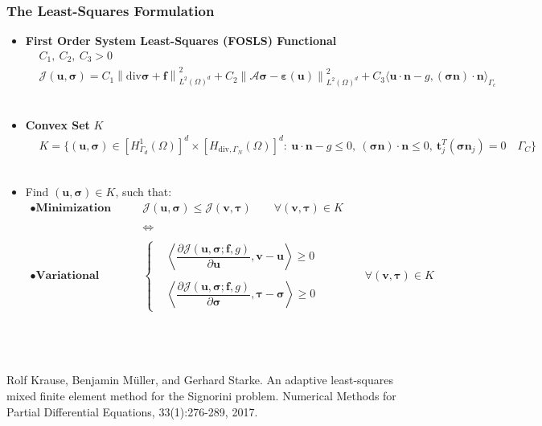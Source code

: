 \documentclass[8pt, oneside]{beamer}   	%
\newcommand{\bff}{\textbf{f}}
\newcommand{\bn}{\textbf{n}}
\newcommand{\btau}{\boldsymbol{\tau}}
\newcommand{\bt}{\textbf{t}}
\newcommand{\bv}{\textbf{v}}
\newcommand{\bu}{\textbf{u}}
\newcommand{\bsigma}{\boldsymbol{\sigma}}
\newcommand\norm[1]{\left\lVert#1\right\rVert}
\newcommand{\titlecolor}[1]{\frametitle{\textcolor{dkgrey}{ \textbf{#1}}}}
\begin{document}
\begin{frame}
\titlecolor{The Least-Squares Formulation}
\begin{itemize}
\item \textbf{First Order System Least-Squares (FOSLS) Functional}
\small
\begin{align*}
& C_1, \:C_2, \: C_3>0 \\
&\mathcal{J}(\bu,\bsigma)=C_{1} \norm{\text{div} \bsigma+\bff}_{L^2(\Omega)^d}^2+C_{2} \norm{\mathcal{A}\bsigma -\boldsymbol{\varepsilon}(\bu)}_{L^2(\Omega)^d}^2   +C_{3} \langle \bu \cdot \bn -g, (\bsigma \bn) \cdot \bn \rangle_{\Gamma_c}
\end{align*} 
${}$\\
\item  
\normalsize
\textbf{Convex Set} $K$
\small
\begin{align*}
& K=\{  \left(\bu,  \bsigma \right)  \in  \left[H_{\Gamma_{d}}^1(\Omega) \right]^d \times \left[ H_{\text{div},\Gamma_N}(\Omega) \right]^d    : \: 
 \bu \cdot \bn - g  \leq 0, \:  (\bsigma \bn) \cdot \bn \leq 0,  \: \bt_j^T(\bsigma \bn_j) =0 \quad  \Gamma_C
 \}
\end{align*}
${}$\\
\item \normalsize 
Find $(\bu,\bsigma) \in K$, such that:
\small
\begin{align*}
\bullet \textbf{Minimization problem:} \qquad  &{ \mathcal{J}(\bu,\bsigma) \leq \mathcal{J}(\bv,\btau ) \qquad \forall (\bv,\btau) \in K}\\\\
&\iff\\\\
\bullet \textbf{Variational Inequality:}\qquad &{
\begin{cases}
&
\left\langle \dfrac{\partial \mathcal{J}(\bu,\bsigma;\bff,g)}{\partial \bu }, \bv-\bu \right\rangle 
\geq 0 \\\\
&
\left\langle \dfrac{\partial \mathcal{J}(\bu,\bsigma;\bff,g)}{\partial \bsigma }, \btau-\bsigma \right\rangle 
\geq 0 
\end{cases}
\qquad \qquad
\forall (\bv, \btau) \in K}
\end{align*}
\end{itemize}
\normalsize
${}$\\
${}$\\${}$\\
\tiny{Rolf Krause, Benjamin M\"{u}ller, and Gerhard Starke. An adaptive least-squares mixed finite element method for the Signorini problem. Numerical Methods for Partial Differential Equations, 33(1):276-289, 2017.}


\end{frame}
\end{document}
